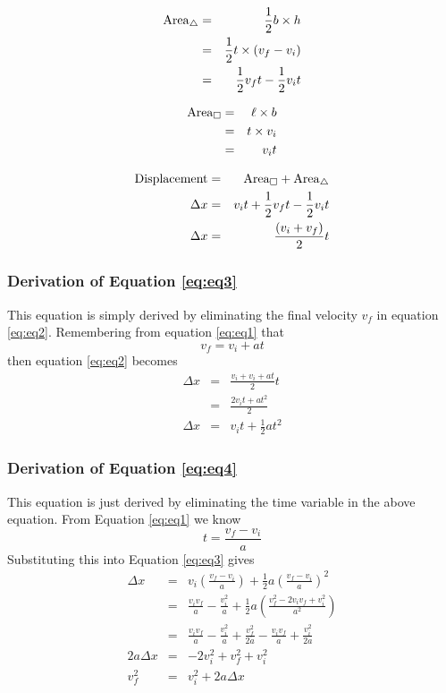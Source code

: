 \begin{eqnarray*}
\rm{Area}_{\triangle} &=& \frac{1}{2}b \times h\\
&=& \frac{1}{2}t \times (v_f - v_i)\\
&=& \frac{1}{2}v_ft - \frac{1}{2}v_it
\end{eqnarray*}

\begin{eqnarray*}
\rm{Area}_{\Box} &=& \ell \times b\\
&=& t \times v_i \\
&=& v_it
\end{eqnarray*}

\begin{eqnarray*}
\rm{Displacement} &=& \rm{Area}_{\Box} + \rm{Area}_{\triangle}\\
\Delta x &=& v_it + \frac{1}{2}v_ft -\frac{1}{2} v_it\\
\Delta x &=& \frac{( v_i+v_f)}{2}t
\end{eqnarray*}

\subsubsection{Derivation of Equation \ref{eq:eq3}}
This equation is simply derived by eliminating the final velocity $v_f$ in equation \ref{eq:eq2}. Remembering from equation \ref{eq:eq1} that
\begin{displaymath}
v_f = v_i + at
\end{displaymath}
then equation \ref{eq:eq2} becomes
\begin{eqnarray*}
\Delta x &=& \frac{v_i+v_i+at}{2}t\\
&=&\frac{2v_it+at^2}{2}\\
\Delta x &=&v_it+\frac{1}{2}at^2
\end{eqnarray*}

\subsubsection{Derivation of Equation \ref{eq:eq4}}
This equation is just derived by eliminating the time variable in the above equation. From Equation \ref{eq:eq1} we know
\begin{displaymath}
t=\frac{v_f -v_i}{a}
\end{displaymath}
\noindent Substituting this into Equation \ref{eq:eq3} gives
\begin{eqnarray}
\Delta x &=& v_i(\frac{v_f - v_i}{a})+\frac{1}{2}a(\frac{v_f -v_i}{a})^2 \nonumber\\
&=& \frac{ v_i v_f}{a}-\frac{ v_i ^2}{a}+\frac{1}{2}a(\frac{v_f^2-2 v_i v_f + v_i^2}{a^2})\nonumber \\
&=& \frac{ v_i v_f}{a}-\frac{ v_i ^2}{a}+\frac{v_f^2}{2a}-\frac{ v_i v_f}{a}+\frac{ v_i^2}{2a}\nonumber\\
2a\Delta x &=& -2 v_i ^2+v_f^2+ v_i ^2 \nonumber\\
v_f^2& =&v_i^2+2a\Delta x
\end{eqnarray}

